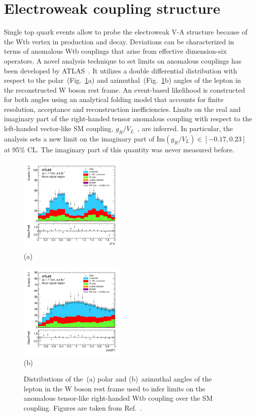 \documentclass{PoS}
\begin{document}
\section{Electroweak coupling structure}
Single top quark events allow to probe the electroweak V-A structure because of the Wtb vertex in production and decay. Deviations can be characterized in terms of anomalous Wtb couplings that arise from effective dimension-six operators. A novel analysis technique to set limits on anomalous couplings has been developed by ATLAS~\cite{atlas-anomcoupl}. It utilizes a double differential distribution with respect to the polar~(Fig.~\ref{fig:angles}a) and azimuthal~(Fig.~\ref{fig:angles}b) angles of the lepton in the reconstructed W boson rest frame.
An event-based likelihood is constructed for both angles using an analytical folding model that accounts for finite resolution, acceptance and reconstruction inefficiencies. Limits on the real and imaginary part of the right-handed tensor anomalous coupling with respect to the left-handed vector-like SM coupling, $g_{R}/V_{L}$~\cite{minimal-anom-set}, are inferred. In particular, the analysis sets a new limit on the imaginary part of $\mathrm{Im}(g_{R}/V_{L})\in[-0.17,0.23]$ at 95\% CL. The imaginary part of this quantity was never measured before.

\begin{figure}[htbp]
\begin{center}
\parbox[t]{0.48\textwidth}{\centering\includegraphics[width=0.46\textwidth]{atlas_anomcoupl/phi.pdf}\\(a)}
\parbox[t]{0.48\textwidth}{\centering\includegraphics[width=0.46\textwidth]{atlas_anomcoupl/theta.pdf}\\(b)}
\end{center}
\caption{\label{fig:angles}Distributions of the~(a) polar and (b)~azimuthal angles of the lepton in the W boson rest frame used to infer limits on the anomalous tensor-like right-handed Wtb coupling over the SM coupling. Figures are taken from Ref.~\cite{atlas-anomcoupl}.}
\end{figure}
\end{document}
